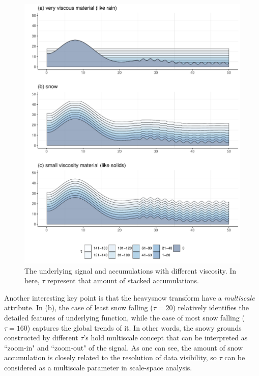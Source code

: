 \documentclass[preprint, review, 12pt]{article}
\theoremstyle{definition}
\theoremstyle{remark}
\begin{document}
\begin{figure}
\centering
\includegraphics[width=1\textwidth]{Fig/Fig2.pdf}
\caption{The underlying signal and accumulations with different viscosity. In here, $\tau$ represent that amount of stacked accumulations.}
\end{figure}

Another interesting key point is that the heavysnow transform have a \emph{multiscale} attribute. In (b), the case of least snow falling ($\tau=20$) relatively identifies the detailed features of underlying function, while the case of most snow falling ($\tau=160$) captures the global trends of it. In other words, the snowy grounds constructed by different $\tau$'s hold multiscale concept that can be interpreted as ``zoom-in" and ``zoom-out" of the signal. As one can see, the amount of snow accumulation is closely related to the resolution of data visibility, so $\tau$ can be considered as a multiscale parameter in scale-space analysis.
\end{document}

